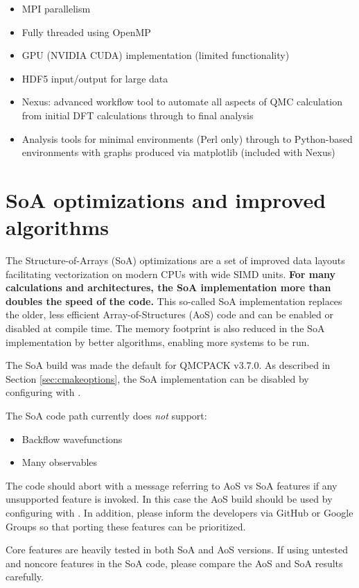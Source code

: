 \begin{itemize}
\item MPI parallelism
\item Fully threaded using OpenMP
\item GPU (NVIDIA CUDA) implementation (limited functionality)
\item HDF5 input/output for large data
\item Nexus: advanced workflow tool to automate all aspects of QMC calculation from initial DFT calculations through to final analysis
\item Analysis tools for minimal environments (Perl only) through to
  Python-based environments with graphs produced via matplotlib (included with Nexus)
\end{itemize}

\section{SoA optimizations and improved algorithms}
The Structure-of-Arrays (SoA) optimizations \cite{IPCC_SC17} are a set
of improved data layouts facilitating vectorization on modern CPUs
with wide SIMD units.  \textbf{For many calculations and
  architectures, the SoA implementation more than doubles the speed of
  the code.}  This so-called SoA implementation replaces the older, less efficient
Array-of-Structures (AoS) code and can be enabled or disabled at compile time. The memory footprint is
also reduced in the SoA implementation by better
algorithms, enabling more systems to be run.

The SoA build was made the default for QMCPACK v3.7.0. As described in Section \ref{sec:cmakeoptions}, the SoA
implementation can be disabled by configuring with .

The SoA code path currently does \textit{not} support:
\begin{itemize}
\item Backflow wavefunctions
\item Many observables
\end{itemize}
  
The code should abort with a message referring to AoS vs SoA features
if any unsupported feature is invoked. In this case the AoS build
should be used by configuring with . In
addition, please inform the developers via GitHub or Google Groups so
that porting these features can be prioritized.

Core features are heavily tested in both SoA and AoS versions. If
using untested and noncore features in the SoA code,
please compare the AoS and SoA results carefully.

